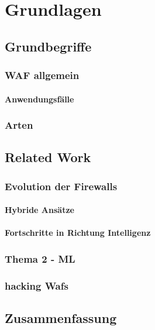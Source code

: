 \chapter{Grundlagen}


\section{Grundbegriffe}
\subsection{WAF allgemein}
\subsubsection{Anwendungsfälle}

\subsection{Arten}

\section{Related Work} %

\subsection{Evolution der Firewalls}

\subsubsection{Hybride Ansätze}


\subsubsection{Fortschritte in Richtung Intelligenz}


\subsection{Thema 2 - ML}


\subsection{hacking Wafs}


\section{Zusammenfassung}

